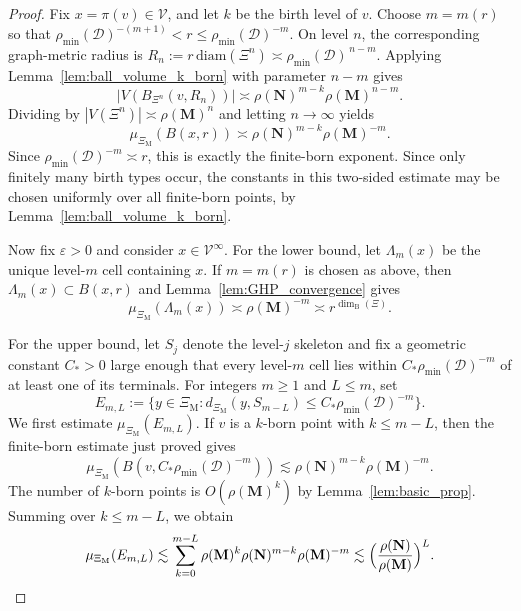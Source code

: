 \documentclass{article}
\theoremstyle{plain}
\theoremstyle{definition}
\newcommand{\diam}{\mathrm{diam}}
\newcommand{\dimbox}{\dim_\mathrm{B}}
\begin{document}
\begin{proof}
Fix $x=\pi(v)\in\mathscr V$, and let $k$ be the birth level of $v$.
Choose $m=m(r)$ so that $\rho_{\min}(\mathcal D)^{-(m+1)}<r\le \rho_{\min}(\mathcal D)^{-m}$.
On level $n$, the corresponding graph-metric radius is $R_n:=r\,\diam(\Xi^n)\asymp \rho_{\min}(\mathcal D)^{\,n-m}$.
Applying Lemma~\ref{lem:ball_volume_k_born} with parameter $n-m$ gives
\[
|V(B_{\Xi^n}(v,R_n))|
\asymp
\rho(\mathbf N)^{m-k}\rho(\mathbf M)^{n-m}.
\]
Dividing by $|V(\Xi^n)|\asymp \rho(\mathbf M)^n$ and letting $n\to\infty$ yields
\[
\mu_{\Xi_{\mathrm M}}(B(x,r))
\asymp
\rho(\mathbf N)^{m-k}\rho(\mathbf M)^{-m}.
\]
Since $\rho_{\min}(\mathcal D)^{-m}\asymp r$, this is exactly the finite-born exponent.
Since only finitely many birth types occur, the constants in this two-sided estimate may be chosen uniformly over all finite-born points, by Lemma~\ref{lem:ball_volume_k_born}.

Now fix $\varepsilon>0$ and consider $x\in\mathscr V^\infty$.
For the lower bound, let $\Lambda_m(x)$ be the unique level-$m$ cell containing $x$.
If $m=m(r)$ is chosen as above, then $\Lambda_m(x)\subset B(x,r)$ and Lemma~\ref{lem:GHP_convergence} gives
\[
\mu_{\Xi_{\mathrm M}}(\Lambda_m(x))
\asymp
\rho(\mathbf M)^{-m}
\asymp
r^{\dimbox(\Xi)}.
\]

For the upper bound, let $S_j$ denote the level-$j$ skeleton and fix a geometric constant $C_*>0$ large enough that every level-$m$ cell lies within $C_*\rho_{\min}(\mathcal D)^{-m}$ of at least one of its terminals.
For integers $m\ge 1$ and $L\le m$, set
\[
E_{m,L}
:=
\{y\in\Xi_{\mathrm M}: d_{\Xi_{\mathrm M}}(y,S_{m-L})\le C_*\rho_{\min}(\mathcal D)^{-m}\}.
\]
We first estimate $\mu_{\Xi_{\mathrm M}}(E_{m,L})$.
If $v$ is a $k$-born point with $k\le m-L$, then the finite-born estimate just proved gives
\[
\mu_{\Xi_{\mathrm M}}(B(v,C_*\rho_{\min}(\mathcal D)^{-m}))
\lesssim
\rho(\mathbf N)^{m-k}\rho(\mathbf M)^{-m}.
\]
The number of $k$-born points is $O(\rho(\mathbf M)^k)$ by Lemma~\ref{lem:basic_prop}.
Summing over $k\le m-L$, we obtain
\[
\mu_{\Xi_{\mathrm M}}(E_{m,L})
\lesssim
\sum_{k=0}^{m-L}
\rho(\mathbf M)^k\rho(\mathbf N)^{m-k}\rho(\mathbf M)^{-m}
\lesssim
\Bigl(\frac{\rho(\mathbf N)}{\rho(\mathbf M)}\Bigr)^L.
\]


\end{proof}
\end{document}
